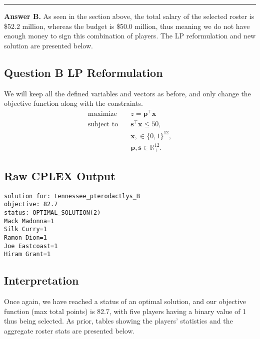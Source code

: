 \documentclass[a4paper,11pt]{article}
\newcommand{\ruler}{
    \vspace{1em}
    \hrule
    \vspace{1em}
}
\begin{document}
\ruler

\textbf{Answer B.} As seen in the section above, the total salary of the selected roster is \$52.2 million, whereas the budget is \$50.0 million, thus meaning we do not have enough money to sign this combination of players. The LP reformulation and new solution are presented below.

\subsection{Question B LP Reformulation}

We will keep all the defined variables and vectors as before, and only change the objective function along with the constraints.
\[
\begin{aligned}
\text{maximize} \quad & z=\bm{p}^\top\bm{x}\\
\text{subject to}\quad
&\bm{s}^\top\bm{x} \leq 50, \\
&\bm{x}, \in \{0,1\}^{12}, \\
&\bm{p}, \bm{s}  \in \mathbb{R}_+^{12}.
\end{aligned}
\]

\subsection{Raw CPLEX Output}
\begin{verbatim}
solution for: tennessee_pterodactlys_B
objective: 82.7
status: OPTIMAL_SOLUTION(2)
Mack Madonna=1
Silk Curry=1
Ramon Dion=1
Joe Eastcoast=1
Hiram Grant=1
\end{verbatim}

\subsection{Interpretation}
Once again, we have reached a status of an optimal solution, and our objective function (max total points) is 82.7, with five players having a binary value of 1 thus being selected. As prior, tables showing the players' statistics and the aggregate roster stats are presented below.
\end{document}
